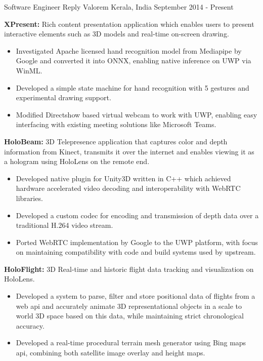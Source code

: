 \documentclass[11pt, a4paper]{awesome-cv}
\begin{document}
\begin{cventries}
	\cventry
	{Software Engineer} %
	{Reply Valorem} %
	{Kerala, India} %
	{September 2014 - Present} %
	{
		\begin{cvitems} %
			\item \textbf{XPresent:} Rich content presentation application which enables users to present interactive elements such as 3D models and real-time on-screen drawing.
				\begin{itemize} 
					\item Investigated Apache licensed hand recognition model from Mediapipe by Google and converted it into ONNX, enabling native inference on UWP via WinML.
					\item Developed a simple state machine for hand recognition with 5 gestures and experimental drawing support.
					\item Modified Directshow based virtual webcam to work with UWP, enabling easy interfacing with existing meeting solutions like Microsoft Teams.
				\end{itemize}
			\item \textbf{HoloBeam:} 3D Telepresence application that captures color and depth information from Kinect, transmits it over the internet and enables viewing it as a hologram using HoloLens on the remote end.
				\begin{itemize} 
					\item Developed native plugin for Unity3D written in C++ which achieved hardware accelerated video decoding and interoperability with WebRTC libraries.
					\item Developed a custom codec for encoding and transmission of depth data over a traditional H.264 video stream.
					\item Ported WebRTC implementation by Google to the UWP platform, with focus on maintaining compatibility with code and build systems used by upstream.
				\end{itemize}
			\item \textbf{HoloFlight:} 3D Real-time and historic flight data tracking and visualization on HoloLens.
				\begin{itemize}
					\item Developed a system to parse, filter and store positional data of flights from a web api and accurately animate 3D representational objects in a scale to world 3D space based on this data, while maintaining strict chronological accuracy.
					\item Developed a real-time procedural terrain mesh generator using Bing maps api, combining both satellite image overlay and height maps.

\end{itemize}
\end{cvitems}}
\end{cventries}
\end{document}
